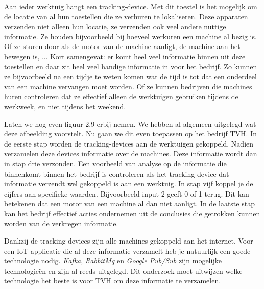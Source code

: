 Aan ieder werktuig hangt een tracking-device. Met dit toestel is het mogelijk om de locatie van al hun toestellen die ze verhuren te lokaliseren. Deze apparaten verzenden niet alleen hun locatie, ze verzenden ook veel andere nuttige informatie. Ze houden bijvoorbeeld bij hoeveel werkuren een machine al bezig is. Of ze sturen door als de motor van de machine aanligt, de machine aan het bewegen is, ... Kort samengevat: er komt heel veel informatie binnen uit deze toestellen en daar zit heel veel handige informatie in voor het bedrijf. Zo kunnen ze bijvoorbeeld na een tijdje te weten komen wat de tijd is tot dat een onderdeel van een machine vervangen moet worden. Of ze kunnen bedrijven die machines huren controleren dat ze effectief alleen de werktuigen gebruiken tijdens de werkweek, en niet tijdens het weekend.

Laten we nog even figuur 2.9 erbij nemen. We hebben al algemeen uitgelegd wat deze afbeelding voorstelt. Nu gaan we dit even toepassen op het bedrijf TVH. In de eerste stap worden de tracking-devices aan de werktuigen gekoppeld. Nadien verzamelen deze devices informatie over de machines. Deze informatie wordt dan in stap drie verzonden. Een voorbeeld van analyse op de informatie die binnenkomt binnen het bedrijf is controleren als het tracking-device dat informatie verzendt wel gekoppeld is aan een werktuig. In stap vijf koppel je de cijfers aan specifieke waarden. Bijvoorbeeld input 2 geeft 0 of 1 terug. Dit kan betekenen dat een motor van een machine al dan niet aanligt. In de laatste stap kan het bedrijf effectief acties ondernemen uit de conclusies die getrokken kunnen worden van de verkregen informatie.

Dankzij de tracking-devices zijn alle machines gekoppeld aan het internet. Voor een IoT-applicatie die al deze informatie verzamelt heb je natuurlijk een goede technologie nodig. \emph{Kafka}, \emph{RabbitMq} en \emph{Google Pub/Sub} zijn mogelijke technologieën en zijn al reeds uitgelegd. Dit onderzoek moet uitwijzen welke technologie het beste is voor TVH om deze informatie te verzamelen.



